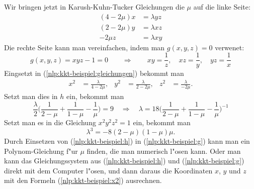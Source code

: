 \begin{beispiel}
Wir bringen jetzt in Karush-Kuhn-Tucker Gleichungen die $\mu$ auf die
linke Seite:
\begin{equation}
\begin{aligned}
(4-2\mu)x&=\lambda yz\\
(2-2\mu)y&=\lambda xz\\
-2\mu z&=\lambda xy
\end{aligned}
\label{nlp:kkt-beispiel:gleichungen}
\end{equation}
Die rechte Seite kann man vereinfachen, indem man $g(x,y,z)=0$ verwenet:
\[
g(x,y,z)=xyz-1=0\qquad\Rightarrow\qquad
xy=\frac1z,\quad
xz=\frac1y,\quad
yz=\frac1x
\]
Eingsetzt  in (\ref{nlp:kkt-beispiel:gleichungen}) bekommt man
\begin{equation}
\begin{aligned}
x^2&=\frac{\lambda}{4-2\mu},&
y^2&=\frac{\lambda}{2-2\mu},&
z^2&=\frac{\lambda}{-2\mu}.
\end{aligned}
\label{nlp:kkt-beispiel:x2}
\end{equation}
Setzt man dies in $h$ ein, bekommt man
\begin{equation}
\frac{\lambda}2
\biggl(
\frac1{2-\mu}+\frac1{1-\mu}-\frac1{\mu}
\biggr) =9
\quad\Rightarrow\quad
\lambda=18\biggl(
\frac1{2-\mu}+\frac1{1-\mu}-\frac1{\mu}
\biggr)^{-1}
\label{nlp:kkt-beispiel:h}
\end{equation}
Setzt man es in die Gleichung $x^2y^2z^2=1$ ein, bekommt man
\begin{equation}
\lambda^3=-8(2-\mu)(1-\mu)\mu.
\label{nlp:kkt-beispiel:g}
\end{equation}
Durch Einsetzen von (\ref{nlp:kkt-beispiel:h}) in (\ref{nlp:kkt-beispiel:g})
kann man ein Polynom-Gleichung f"ur $\mu$ finden, die man numerisch
l"osen kann. Oder man kann das Gleichungssystem aus
(\ref{nlp:kkt-beispiel:h}) und (\ref{nlp:kkt-beispiel:g}) direkt
mit dem Computer l"osen, und dann daraus die Koordinaten $x$, $y$ und
$z$ mit den Formeln (\ref{nlp:kkt-beispiel:x2}) ausrechnen.
\end{beispiel}

